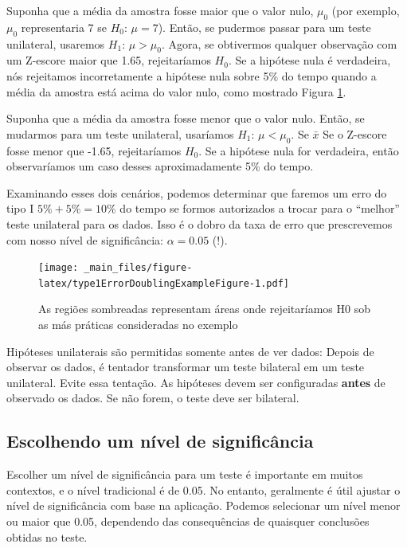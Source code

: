 \documentclass[
]{book}
\theoremstyle{definition}
\theoremstyle{definition}
\theoremstyle{definition}
\theoremstyle{definition}
\theoremstyle{remark}
\begin{document}
Suponha que a média da amostra fosse maior que o valor nulo, \(\mu_0\) (por exemplo, \(\mu_0\) representaria 7 se \(H_0\): \(\mu = 7\)). Então, se pudermos passar para um teste unilateral, usaremos \(H_1\): \(\mu > \mu_0\). Agora, se obtivermos qualquer observação com um Z-escore maior que 1.65, rejeitaríamos \(H_0\). Se a hipótese nula é verdadeira, nós rejeitamos incorretamente a hipótese nula sobre 5\% do tempo quando a média da amostra está acima do valor nulo, como mostrado Figura \ref{fig:type1ErrorDoublingExampleFigure}.

Suponha que a média da amostra fosse menor que o valor nulo. Então, se mudarmos para um teste unilateral, usaríamos \(H_1\): \(\mu < \mu_0\). Se \(\bar{x}\) Se o Z-escore fosse menor que -1.65, rejeitaríamos \(H_0\). Se a hipótese nula for verdadeira, então observaríamos um caso desses aproximadamente 5\% do tempo.

Examinando esses dois cenários, podemos determinar que faremos um erro do tipo I \(5\%+5\%=10\%\) do tempo se formos autorizados a trocar para o ``melhor'' teste unilateral para os dados. Isso é o dobro da taxa de erro que prescrevemos com nosso nível de significância: \(\alpha=0.05\) (!).

\begin{figure}
\centering
\texttt{[image: \_main\_files/figure-latex/type1ErrorDoublingExampleFigure-1.pdf]}
\caption{\label{fig:type1ErrorDoublingExampleFigure}As regiões sombreadas representam áreas onde rejeitaríamos H0 sob as más práticas consideradas no exemplo}
\end{figure}

Hipóteses unilaterais são permitidas somente antes de ver dados: Depois de observar os dados, é tentador transformar um teste bilateral em um teste unilateral. Evite essa tentação. As hipóteses devem ser configuradas \textbf{antes} de observado os dados. Se não forem, o teste deve ser bilateral.

\hypertarget{chosingLevelConfidence}{%
\subsection{Escolhendo um nível de significância}\label{chosingLevelConfidence}}

Escolher um nível de significância para um teste é importante em muitos contextos, e o nível tradicional é de 0.05. No entanto, geralmente é útil ajustar o nível de significância com base na aplicação. Podemos selecionar um nível menor ou maior que 0.05, dependendo das consequências de quaisquer conclusões obtidas no teste.
\end{document}
